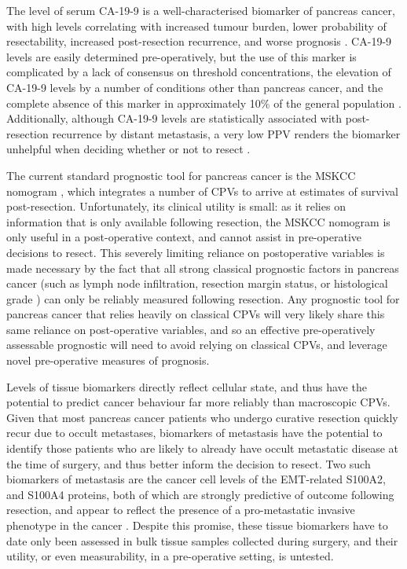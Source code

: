 \documentclass[dissertation.tex]{subfiles}
\begin{document}
The level of serum \gls{CA-19-9} is a well-characterised biomarker of pancreas cancer, with high levels correlating with increased tumour burden, lower probability of resectability, increased post-resection recurrence, and worse prognosis \cite{Kim2011, Ballehaninna2012, Barugola2007, Lundin1994}.  \Gls{CA-19-9} levels are easily determined pre-operatively, but the use of this marker is complicated by a lack of consensus on threshold concentrations, the elevation of \gls{CA-19-9} levels by a number of conditions other than pancreas cancer, and the complete absence of this marker in approximately 10\% of the general population \cite{Ballehaninna2012}.  Additionally, although \gls{CA-19-9} levels are statistically associated with post-resection recurrence by distant metastasis, a very low \gls{PPV} renders the biomarker unhelpful when deciding whether or not to resect \cite{Kim2011}.

The current standard prognostic tool for pancreas cancer is the \gls{MSKCC} nomogram \cite{Brennan2004}, which integrates a number of \glspl{CPV} to arrive at estimates of survival post-resection.  Unfortunately, its clinical utility is small: as it relies on information that is only available following resection, the \gls{MSKCC} nomogram is only useful in a post-operative context, and cannot assist in pre-operative decisions to resect.  This severely limiting reliance on postoperative variables is made necessary by the fact that all strong classical prognostic factors in pancreas cancer (such as lymph node infiltration, resection margin status, or histological grade \cite{Bilici2014}) can only be reliably measured following resection.  Any prognostic tool for pancreas cancer that relies heavily on classical \glspl{CPV} will very likely share this same reliance on post-operative variables, and so an effective pre-operatively assessable prognostic will need to avoid relying on classical \glspl{CPV}, and leverage novel pre-operative measures of prognosis.

Levels of tissue biomarkers directly reflect cellular state, and thus have the potential to predict cancer behaviour far more reliably than macroscopic \glspl{CPV}.  Given that most pancreas cancer patients who undergo curative resection quickly recur due to occult metastases, biomarkers of metastasis have the potential to identify those patients who are likely to already have occult metastatic disease at the time of surgery, and thus better inform the decision to resect.  Two such biomarkers of metastasis are the cancer cell levels of the \gls{EMT}-related S100A2, and S100A4 proteins, both of which are strongly predictive of outcome following resection, and appear to reflect the presence of a pro-metastatic invasive phenotype in the cancer \cite{Biankin2008, Tsukamoto2013, Lee2014}.  Despite this promise, these tissue biomarkers have to date only been assessed in bulk tissue samples collected during surgery, and their utility, or even measurability, in a pre-operative setting, is untested.
\end{document}
